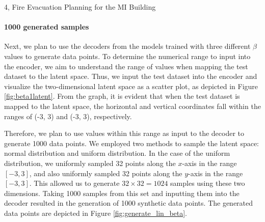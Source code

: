 \begin{task}{4, Fire Evacuation Planning for the MI Building}
\paragraph{1000 generated samples}
Next, we plan to use the decoders from the models trained with three different \(\beta\) values to generate data points. To determine the numerical range to input into the encoder, we aim to understand the range of values when mapping the test dataset to the latent space. Thus, we input the test dataset into the encoder and visualize the two-dimensional latent space as a scatter plot, as depicted in Figure \ref{fig:beta1latent}. From the graph, it is evident that when the test dataset is mapped to the latent space, the horizontal and vertical coordinates fall within the ranges of (-3, 3) and (-3, 3), respectively.


Therefore, we plan to use values within this range as input to the decoder to generate 1000 data points. We employed two methods to sample the latent space: normal distribution and uniform distribution. In the case of the uniform distribution, we uniformly sampled 32 points along the \(x\)-axis in the range \([-3, 3]\), and also uniformly sampled 32 points along the \(y\)-axis in the range \([-3, 3]\). This allowed us to generate \(32 \times 32 = 1024\) samples using these two dimensions. Taking 1000 samples from this set and inputting them into the decoder resulted in the generation of 1000 synthetic data points. The generated data points are depicted in Figure \ref{fig:generate_lin_beta}.

\begin{figure}[ht]
\centering


\end{figure}
\end{task}
